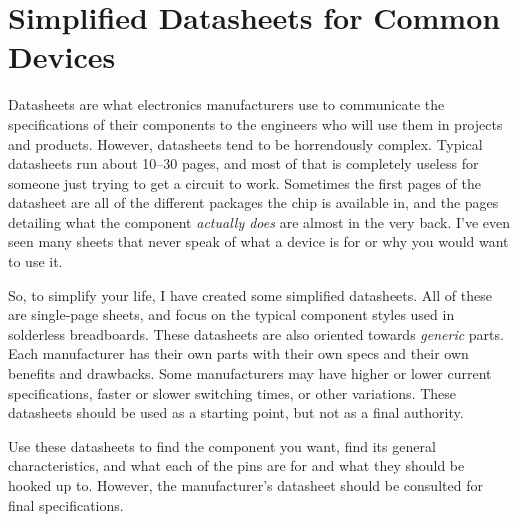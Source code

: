 \chapter{Simplified Datasheets for Common Devices}
\label{appSimplifiedDatasheets}

Datasheets are what electronics manufacturers use to communicate the specifications of their components to the engineers who will use them in projects and products.
However, datasheets tend to be horrendously complex.
Typical datasheets run about 10--30 pages, and most of that is completely useless for someone just trying to get a circuit to work.
Sometimes the first pages of the datasheet are all of the different packages the chip is available in, and the pages detailing what the component \emph{actually does} are almost in the very back. 
I've even seen many sheets that never speak of what a device is for or why you would want to use it.

So, to simplify your life, I have created some simplified datasheets.
All of these are single-page sheets, and focus on the typical component styles used in solderless breadboards.
These datasheets are also oriented towards \emph{generic} parts. 
Each manufacturer has their own parts with their own specs and their own benefits and drawbacks.
Some manufacturers may have higher or lower current specifications, faster or slower switching times, or other variations.
These datasheets should be used as a starting point, but not as a final authority.

Use these datasheets to find the component you want, find its general characteristics, and what each of the pins are for and what they should be hooked up to.
However, the manufacturer's datasheet should be consulted for final specifications.
